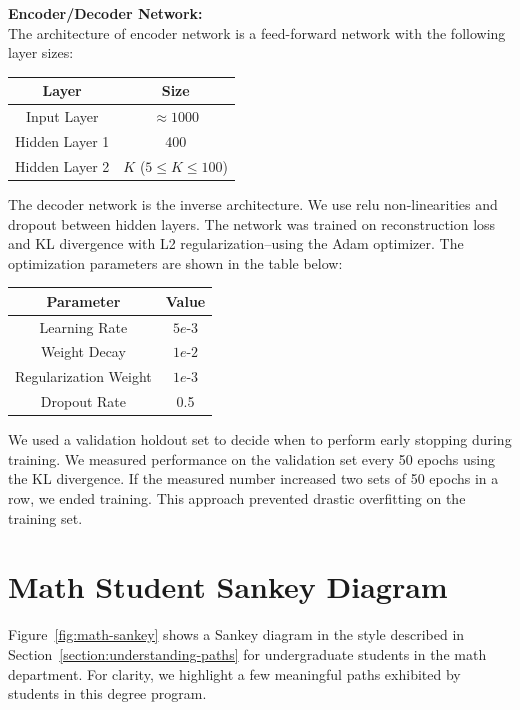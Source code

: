 \documentclass{edm_template}
\begin{document}
\textbf{Encoder/Decoder Network:} \\
The architecture of encoder network is a feed-forward network with the following layer sizes:
\begin{center}
\begin{tabular}{|c|c|}
\hline
Layer & Size \\
\hline 
Input Layer & $\approx 1000$ \\
Hidden Layer 1  & 400 \\
Hidden Layer 2 & $K$ ($5 \leq K \leq 100$) \\
\hline
\end{tabular}
\end{center}
The decoder network is the inverse architecture. We use relu non-linearities and dropout between hidden layers. The network was trained on reconstruction loss and KL divergence with L2 regularization--using the Adam optimizer. The optimization parameters are shown in the table below:
\begin{center}
\begin{tabular}{|c|c|}
\hline
Parameter & Value \\
\hline 
Learning Rate & $5e$-$3$ \\
Weight Decay  & $1e$-$2$ \\
Regularization Weight & $1e$-$3$ \\
Dropout Rate & 0.5 \\
\hline
\end{tabular}
\end{center}
We used a validation holdout set to decide when to perform early stopping during training. We measured performance on the validation set every 50 epochs using the KL divergence. If the measured number increased two sets of 50 epochs in a row, we ended training. This approach prevented drastic overfitting on the training set. 

\section{Math Student Sankey Diagram}
\label{app:math_sankey}

Figure~\ref{fig:math-sankey} shows a Sankey diagram in the style described in Section~\ref{section:understanding-paths} for undergraduate students in the math department. For clarity, we highlight a few meaningful paths exhibited by students in this degree program. 
\end{document}
